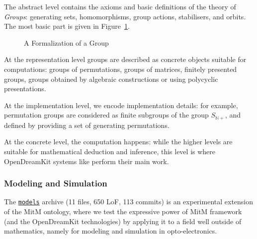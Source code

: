The abstract level contains the axioms and basic definitions of the theory of \emph{Groups}: generating sets, homomorphisms, group actions, stabilisers, and orbits.
The most basic part is given in Figure~\ref{fig:mitm1}. 
\begin{figure}[ht]\centering
  \caption{A Formalization of a Group}\label{fig:mitm1}
\end{figure}

At the representation level groups are described as concrete objects
suitable for computations: groups of permutations, groups of matrices,
finitely presented groups, groups obtained by algebraic constructions or using
polycyclic presentations.

At the implementation level, we encode implementation details: for
example, permutation groups are considered as finite subgroups of the group $S_{\mathbb{N}+}$, and defined  by
providing a set of generating permutations.

At the concrete level, the computation happens: while the higher levels
are suitable for mathematical deduction and inference, this level is where OpenDreamKit systems like \GAP perform their main work.

\subsubsection{Modeling and Simulation}

The \href{https://gl.mathhub.info/MitM/smglom}{\texttt{models}}
archive (11 files, 650 LoF, 113 commits) is an experimental extension
of the MitM ontology, where we test the expressive power of MitM
framework (and the OpenDreamKit technologies) by applying it to a
field well outside of mathematics, namely for modeling and simulation
in opto-electronics.

